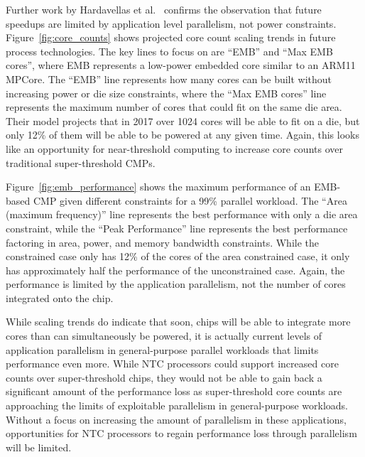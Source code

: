Further work by Hardavellas et al.~\cite{Hardavellas:2011de} confirms the
observation that future speedups are limited by application level parallelism,
not power constraints. Figure~\ref{fig:core_counts} shows projected core count
scaling trends in future process technologies. The key lines to focus on are
``EMB'' and ``Max EMB cores'', where EMB represents a low-power embedded core
similar to an ARM11 MPCore. The ``EMB'' line represents how many cores can be
built without increasing power or die size constraints, where the ``Max EMB
cores'' line represents the maximum number of cores that could fit on the same
die area.  Their model projects that in 2017 over 1024 cores will be able to fit
on a die, but only 12\% of them will be able to be powered at any given time.
Again, this looks like an opportunity for near-threshold computing to increase
core counts over traditional super-threshold CMPs.

Figure~\ref{fig:emb_performance} shows the maximum performance of an EMB-based
CMP given different constraints for a 99\% parallel workload. The ``Area
(maximum frequency)'' line represents the best performance with only a die area
constraint, while the ``Peak Performance'' line represents the best performance
factoring in area, power, and memory bandwidth constraints. While the
constrained case only has 12\% of the cores of the area constrained case, it
only has approximately half the performance of the unconstrained case. Again,
the performance is limited by the application parallelism, not the number of
cores integrated onto the chip.

While scaling trends do indicate that soon, chips will be able to integrate more
cores than can simultaneously be powered, it is actually current 
levels of application parallelism in general-purpose parallel workloads that limits
performance even more. While NTC processors could support increased core counts
over super-threshold chips, they would not be able to gain back a significant
amount of the performance loss as super-threshold core counts are approaching
the limits of exploitable parallelism in general-purpose workloads. Without a
focus on increasing the amount of parallelism in these applications,
opportunities for NTC processors to regain performance loss through parallelism
will be limited.

